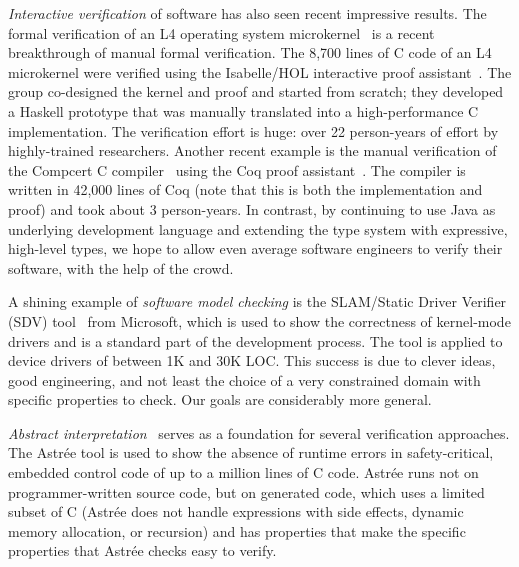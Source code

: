 \documentclass[preprint]{sig-alternate}
\begin{document}
\emph{Interactive verification} of software has also seen recent impressive
results.
The formal verification of an L4 operating system
microkernel~\cite{Klein_EHACDEEKNSTW_10}
is a recent breakthrough of manual formal verification.
The 8,700 lines of C code of an L4 microkernel were verified using the
Isabelle/HOL interactive proof assistant~\cite{Isabelle2002}.
The group co-designed the kernel and proof and started from scratch;
they developed a Haskell prototype that was manually translated into a
high-performance C implementation.
The verification effort is huge:  over 22 person-years of effort by
highly-trained researchers.
Another recent example is the manual verification of the Compcert C
compiler~\cite{Leroy2009} using the Coq proof assistant~\cite{Coq2004}.
The compiler is written in 42,000 lines of Coq (note that this is both
the implementation and proof) and took about 3 person-years.
In contrast, by continuing to use Java as underlying development
language and extending the type system with expressive, high-level
types, we hope to allow even average software engineers to verify
their software, with the help of the crowd.

A shining example of \emph{software model checking}
is the SLAM/Static Driver Verifier (SDV)
tool~\cite{BallMMR2001,BallBKL2010,BallLR2011} from Microsoft, which
is used to show the correctness of kernel-mode drivers and is a standard
part of the development process.
The tool is applied to device drivers of between 1K and 30K LOC\@.
This success is due to clever ideas, good engineering, and not least the
choice of a very constrained domain with specific properties to check.  Our
goals are considerably more general.

\newcommand\astree{Astr\'{e}e}

\emph{Abstract interpretation}~\cite{CousotCousot1977,Cousot2007}
serves as a foundation for several verification approaches.
The \astree{} tool is used to show the absence of runtime errors in
safety-critical, embedded control code of up to a million lines of C
code.
\astree{} runs not on
programmer-written source code, but on generated code, which uses a limited
subset of C (\astree{} does not handle expressions with side effects,
dynamic memory allocation, or recursion) and has properties
that make the specific properties that \astree{} checks easy to verify.
\end{document}
